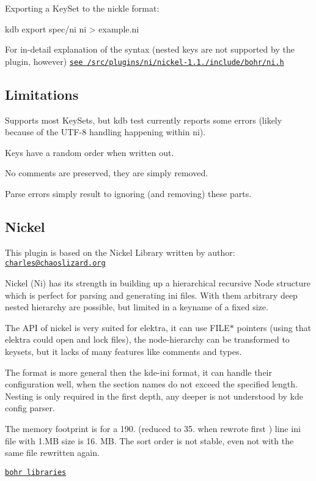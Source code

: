 Exporting a Key\+Set to the nickle format\+: \begin{DoxyVerb}kdb export spec/ni ni > example.ni
\end{DoxyVerb}


For in-\/detail explanation of the syntax (nested keys are not supported by the plugin, however) \href{/home/markus/Projekte/Elektra/current/src/plugins/ni/nickel-1.1.0/include/bohr/ni.h}{\tt see /src/plugins/ni/nickel-\/1.1./include/bohr/ni.h}

\subsection*{Limitations}


\begin{DoxyItemize}
\item Supports most Key\+Sets, but {\ttfamily kdb test} currently reports some errors (likely because of the U\+T\+F-\/8 handling happening within ni).
\item Keys have a random order when written out.
\item No comments are preserved, they are simply removed.
\item Parse errors simply result to ignoring (and removing) these parts.
\end{DoxyItemize}

\subsection*{Nickel}

This plugin is based on the Nickel Library written by author\+: \href{mailto:charles@chaoslizard.org}{\tt charles@chaoslizard.\+org}

Nickel (Ni) has its strength in building up a hierarchical recursive Node structure which is perfect for parsing and generating ini files. With them arbitrary deep nested hierarchy are possible, but limited in a keyname of a fixed size.

The A\+P\+I of nickel is very suited for elektra, it can use {\ttfamily F\+I\+L\+E$\ast$} pointers (using that elektra could open and lock files), the node-\/hierarchy can be transformed to keysets, but it lacks of many features like comments and types.

The format is more general then the kde-\/ini format, it can handle their configuration well, when the section names do not exceed the specified length. Nesting is only required in the first depth, any deeper is not understood by kde config parser.

The memory footprint is for a 190. (reduced to 35. when rewrote first ) line ini file with 1.\+M\+B size is 16. M\+B. The sort order is not stable, even not with the same file rewritten again.

\href{https://github.com/chazomaticus/bohr}{\tt bohr libraries} 